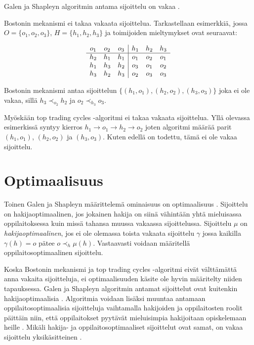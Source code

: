 \documentclass[gradu, twoside]{tktltiki}
\begin{document}
Galen ja Shapleyn algoritmin antama sijoittelu on vakaa
\cite{galeshapley62}.

Bostonin mekanismi ei takaa vakaata sijoittelua. Tarkastellaan
esimerkkiä, jossa $O = \{o_1, o_2, o_3\}$, $H = \{h_1, h_2, h_3\}$ ja
toimijoiden mieltymykset ovat seuraavat:

\[
  \begin{array}{c c c}
    o_1 & o_2 & o_3 \\
    \hline
    h_2 & h_1 & h_1 \\
    h_1 & h_3 & h_2 \\
    h_3 & h_2 & h_3
  \end{array}
  \begin{array}{|c c c}
    h_1 & h_2 & h_3 \\
    \hline
    o_1 & o_2 & o_1 \\
    o_3 & o_1 & o_2 \\
    o_2 & o_3 & o_3
  \end{array}
\]

Bostonin mekanismi antaa sijoittelun $\{(h_1, o_1), (h_2, o_2), (h_3,
o_3)\}$ joka ei ole vakaa, sillä $h_3 \prec_{o_2} h_2$ ja $o_2
\prec_{h_3} o_3$.

Myöskään top trading cycles -algoritmi ei takaa vakaata sijoittelua.
Yllä olevassa esimerkissä syntyy kierros $h_1 \rightarrow o_1
\rightarrow h_2 \rightarrow o_2$ joten algoritmi määrää parit $(h_1,
o_1)$, $(h_2, o_2)$ ja $(h_3, o_3)$. Kuten edellä on todettu, tämä ei
ole vakaa sijoittelu.

\section{Optimaalisuus}

Toinen Galen ja Shapleyn määrittelemä ominaisuus on optimaalisuus
\cite{galeshapley62}. Sijoittelu on hakijaoptimaalinen, jos jokainen
hakija on siinä vähintään yhtä mieluisassa oppilaitoksessa kuin missä
tahansa muussa vakaassa sijoittelussa. Sijoittelu $\mu$ on
\emph{hakijaoptimaalinen}, jos ei ole olemassa toista vakaata
sijoittelu $\gamma$ jossa kaikilla $\gamma(h) = o$ pätee $o \prec_h
\mu(h)$. Vastaavasti voidaan määritellä oppilaitosoptimaalinen
sijoittelu.

Koska Bostonin mekanismi ja top trading cycles -algoritmi eivät
välttämättä anna vakaita sijoitteluja, ei optimaalisuuden käsite ole
hyvin määritelty niiden tapauksessa. Galen ja Shapleyn algoritmin
antamat sijoittelut ovat kuitenkin hakijaoptimaalisia
\cite{galeshapley62}. Algoritmia voidaan lisäksi muuntaa antamaan
oppilaitosoptimaalisia sijoitteluja vaihtamalla hakijoiden ja
oppilaitosten roolit päittäin niin, että oppilaitokset pyytävät
mieluisimpia hakijoitaan opiskelemaan heille \cite{galeshapley62}.
Mikäli hakija- ja oppilaitosoptimaaliset sijoittelut ovat samat, on
vakaa sijoittelu yksikäsitteinen \cite{galeshapley62}.
\end{document}

